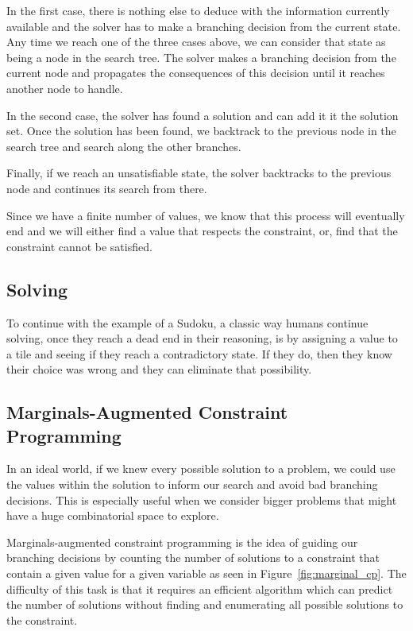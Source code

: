 \documentclass[../Document.tex]{subfiles}
\begin{document}
In the first case, there is nothing else to deduce with the information currently available and the solver has to make a branching decision from the current state. Any time we reach one of the three cases above, we can consider that state as being a node in the search tree. The solver makes a branching decision from the current node and propagates the consequences of this decision until it reaches another node to handle.

In the second case, the solver has found a solution and can add it it the solution set. Once the solution has been found, we backtrack to the previous node in the search tree and search along the other branches.

Finally, if we reach an unsatisfiable state, the solver backtracks to the previous node and continues its search from there.

Since we have a finite number of values, we know that this process will eventually end and we will either find a value that respects the constraint, or, find that the constraint cannot be satisfied.


\subsection{Solving}
To continue with the example of a Sudoku, a classic way humans continue solving, once they reach a dead end in their reasoning, is by assigning a value to a tile and seeing if they reach a contradictory state.
If they do, then they know their choice was wrong and they can eliminate that possibility.


\subsection{Marginals-Augmented Constraint Programming}
In an ideal world, if we knew every possible solution to a problem, we could use the values within the solution to inform our search and avoid bad branching decisions. This is especially useful when we consider bigger problems that might have a huge combinatorial space to explore.

Marginals-augmented constraint programming is the idea of guiding our branching decisions by counting the number of solutions to a constraint that contain a given value for a given variable as seen in Figure~\ref{fig:marginal_cp}. The difficulty of this task is that it requires an efficient algorithm which can predict the number of solutions without finding and enumerating all possible solutions to the constraint.
\end{document}
